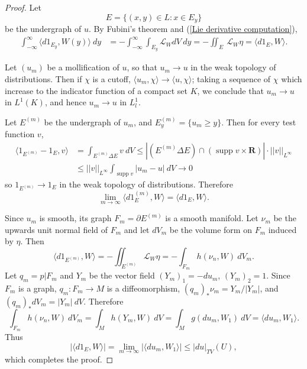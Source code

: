 \documentclass[reqno,12pt,letterpaper]{amsart}
\newcommand{\RR}{\mathbf{R}}
\DeclareMathOperator{\supp}{supp}
\theoremstyle{definition}
\numberwithin{equation}{section}
\begin{document}
\begin{proof}
Let
$$E = \{(x, y) \in L: x \in E_y\}$$
be the undergraph of $u$.
By Fubini's theorem and (\ref{Lie derivative computation}),
\begin{align*}
\int_{-\infty}^\infty \langle d 1_{E_y}, W(y)\rangle ~dy &= -\int_{-\infty}^\infty \int_{E_y} \mathcal L_WdV ~dy = -\iint_E ~\mathcal L_W\eta = \langle d 1_E, W\rangle.
\end{align*}

Let $(u_m)$ be a mollification of $u$, so that $u_m \to u$ in the weak topology of distributions.
Then if $\chi$ is a cutoff, $\langle u_m, \chi\rangle \to \langle u, \chi\rangle$; taking a sequence of $\chi$ which increase to the indicator function of a compact set $K$, we conclude that $u_m \to u$ in $L^1(K)$, and hence $u_m \to u$ in $L^1_l$.

Let $E^{(m)}$ be the undergraph of $u_m$, and $E^{(m)}_y = \{u_m \geq y\}$.
Then for every test function $v$,
\begin{align*}
\langle 1_{E^{(m)}} - 1_E, v\rangle &= \int_{E^{(m)} \Delta E} v ~dV \leq |(E^{(m)} \Delta E) \cap (\supp v \times \RR)| \cdot ||v||_{L^\infty}\\
&\leq ||v||_{L^\infty} \int_{\supp v} |u_m - u| ~dV \to 0
\end{align*}
so $1_{E^{(m)}} \to 1_E$ in the weak topology of distributions.
Therefore
$$\lim_{m \to \infty} \langle d 1_E^{(m)}, W\rangle = \langle d 1_E, W\rangle.$$

Since $u_m$ is smooth, its graph $F_m = \partial E^{(m)}$ is a smooth manifold.
Let $\nu_m$ be the upwards unit normal field of $F_m$ and let $dV_m$ be the volume form on $F_m$ induced by $\eta$.
Then
$$\langle d 1_{E^{(m)}}, W\rangle = -\iint_{E^{(m)}} \mathcal L_W\eta = -\int_{F_m} h(\nu_n, W) ~dV_m.$$
Let $q_m = p|F_m$ and $Y_m$ be the vector field $(Y_m)_1 = -d u_m$, $(Y_m)_2 = 1$.
Since $F_m$ is a graph, $q_m: F_m \to M$ is a diffeomorphism, $(q_m)_*\nu_m = Y_m/|Y_m|$, and $(q_m)_*dV_m = |Y_m|~dV$. Therefore
$$\int_{F_m} h(\nu_n, W) ~dV_m = \int_M h(Y_m, W) ~dV = \int_M g(d u_m, W_1) ~dV = \langle d u_m, W_1\rangle.$$
Thus
$$|\langle d 1_E, W\rangle| = \lim_{m \to \infty} |\langle d u_m, W_1\rangle| \leq |d u|_{TV}(U),$$
which completes the proof.
\end{proof}
\end{document}
